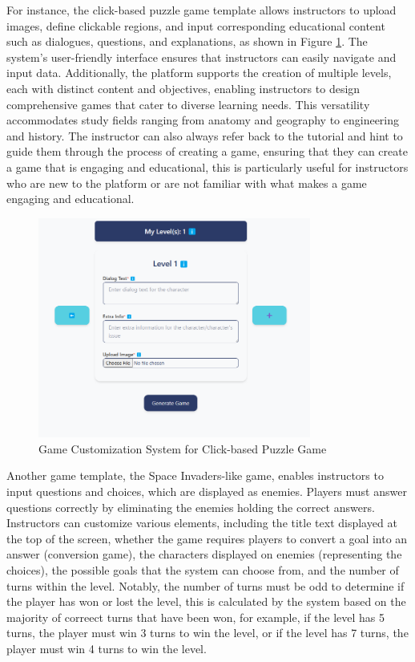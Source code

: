 For instance, the click-based puzzle game template allows instructors to upload images, define clickable regions, and input corresponding educational content such as dialogues, questions, and explanations, as shown in Figure \ref{fig:customizationClickPuzzle}. The system’s user-friendly interface ensures that instructors can easily navigate and input data. Additionally, the platform supports the creation of multiple levels, each with distinct content and objectives, enabling instructors to design comprehensive games that cater to diverse learning needs. This versatility accommodates study fields ranging from anatomy and geography to engineering and history. The instructor can also always refer back to the tutorial and hint to guide them through the process of creating a game, ensuring that they can create a game that is engaging and educational, this is particularly useful for instructors who are new to the platform or are not familiar with what makes a game engaging and educational.

\begin{figure}
	\centering
	\includegraphics[width=0.8\textwidth]{figures/Diagnose_Game/Instructor_Portal_Diagnose_Game.png}
	\caption{Game Customization System for Click-based Puzzle Game}
	\label{fig:customizationClickPuzzle}
\end{figure}


Another game template, the Space Invaders-like game, enables instructors to input questions and choices, which are displayed as enemies. Players must answer questions correctly by eliminating the enemies holding the correct answers. Instructors can customize various elements, including the title text displayed at the top of the screen, whether the game requires players to convert a goal into an answer (conversion game), the characters displayed on enemies (representing the choices), the possible goals that the system can choose from, and the number of turns within the level. Notably, the number of turns must be odd to determine if the player has won or lost the level, this is calculated by the system based on the majority of correect turns that have been won, for example, if the level has 5 turns, the player must win 3 turns to win the level, or if the level has 7 turns, the player must win 4 turns to win the level.

